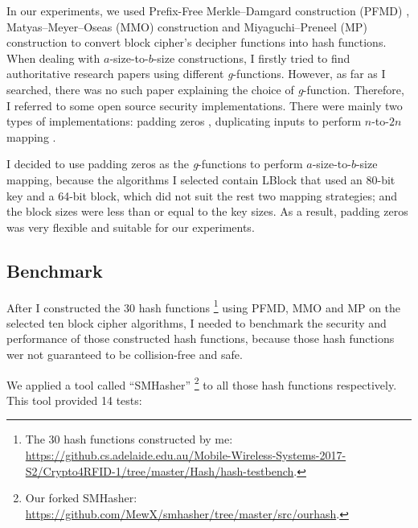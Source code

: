 \documentclass[sigconf, review=false]{acmart}
\begin{document}
In our experiments, we used Prefix-Free Merkle--Damgard construction (PFMD) \cite{mirvaziri2007collision}, Matyas--Meyer--Oseas (MMO) construction \cite{wikipedia2017one}
and Miyaguchi--Preneel (MP) construction \cite{wikipedia2017one} to convert block cipher's decipher functions into hash functions.
When dealing with $a$-size-to-$b$-size constructions, I firstly tried to find authoritative research papers using different \textit{g}-functions.
However, as far as I searched, there was no such paper explaining the choice of \textit{g}-function.
Therefore, I referred to some open source security implementations.
There were mainly two types of implementations: padding zeros \cite{naoyukimorita2017},
duplicating inputs to perform $n$-to-$2n$ mapping \cite{nikhilvarghese2017}.

I decided to use padding zeros as the \textit{g}-functions to perform $a$-size-to-$b$-size mapping,
because the algorithms I selected contain LBlock that used an 80-bit key and a 64-bit block,
which did not suit the rest two mapping strategies; and the block sizes were less than or equal to the key sizes.
As a result, padding zeros was very flexible and suitable for our experiments.


\subsection{Benchmark}
After I constructed the 30 hash functions \footnote{The 30 hash functions constructed by me: \url{https://github.cs.adelaide.edu.au/Mobile-Wireless-Systems-2017-S2/Crypto4RFID-1/tree/master/Hash/hash-testbench}.}
using PFMD, MMO and MP on the selected ten block cipher algorithms,
I needed to benchmark the security and performance of those constructed hash functions,
because those hash functions wer not guaranteed to be collision-free and safe.

We applied a tool called ``SMHasher'' \footnote{Our forked SMHasher: \url{https://github.com/MewX/smhasher/tree/master/src/ourhash}.}
to all those hash functions respectively.
This tool provided 14 tests:
\end{document}
